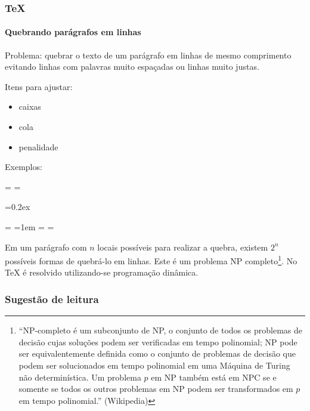 \begin{frame}[allowframebreaks]
\frametitle{\TeX{}}
\framesubtitle{Quebrando parágrafos em linhas}

Problema: quebrar o texto de um parágrafo em linhas de mesmo comprimento
evitando linhas com palavras muito espaçadas ou linhas muito justas.

Itens para ajustar:
\begin{itemize}
\item caixas
\item cola
\item penalidade
\end{itemize}

\framebreak
Exemplos:

\vspace{2ex}
{
\newdimen\origiwspc%
\newdimen\origiwstr%
\origiwspc=\font%
\origiwstr=\font%
\lipsum[1][1-3]

\vspace{2ex}
\font=0.2ex%
\lipsum[1][1-3]%

\vspace{2ex}
\font=\origiwstr%
\font=1em%
\lipsum[1][1-3]%
\font=\origiwspc%
\font=\origiwstr%
}


\framebreak

Em um parágrafo com $n$ locais possíveis para realizar a quebra, existem $2^n$ possíveis formas
de quebrá-lo em linhas. Este é um problema NP completo\footnote{
``NP-completo é um subconjunto de NP, o conjunto de todos os problemas de decisão cujas soluções podem ser verificadas em tempo polinomial; NP pode ser equivalentemente definida como o conjunto de problemas de decisão que podem ser solucionados em tempo polinomial em uma Máquina de Turing não determinística. Um problema $p$ em NP também está em NPC se e somente se todos os outros problemas em NP podem ser transformados em $p$ em tempo polinomial.'' (Wikipedia)
}. No \TeX{} é resolvido utilizando-se programação dinâmica.

\vspace{3ex}

\end{frame}



\begin{frame}
\frametitle{Sugestão de leitura}

\vspace{2ex}

\vspace{2ex}

\vspace{2ex}

\vspace{2ex}


\end{frame}
